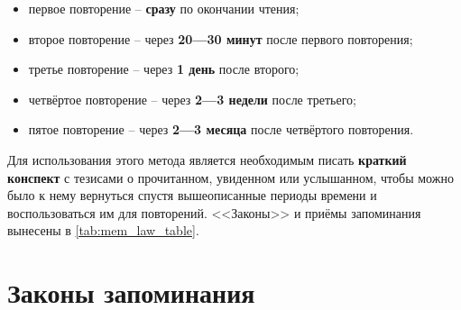 \documentclass[12pt]{article}			%
\begin{document}
\begin{outline}[enumerate]
\begin{itemize}
	\item первое повторение -- \textbf{сразу} по окончании чтения;
	\item второе повторение -- через \textbf{20—30 минут} после первого повторения;
	\item третье повторение -- через \textbf{1 день} после второго;
	\item четвёртое повторение -- через \textbf{2—3 недели} после третьего;
	\item пятое повторение -- через \textbf{2—3 месяца} после четвёртого повторения.
\end{itemize}

Для использования этого метода является необходимым писать \textbf{краткий конспект} с тезисами о прочитанном, увиденном или услышанном, чтобы можно было к нему вернуться спустя вышеописанные периоды времени и воспользоваться им для повторений. <<Законы>> и приёмы запоминания вынесены в \autoref{tab:mem_law_table}.
\end{outline}

\newpage
\section{Законы запоминания}
\end{document}
